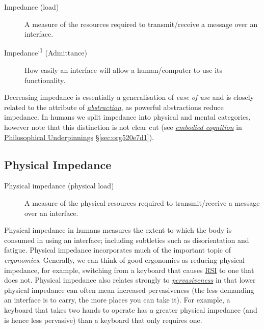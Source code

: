 \documentclass[logo,bsc,singlespacing,parskip]{infthesis}
\begin{document}
\begin{mdframed}
\begin{description}
\item[{Impedance\label{impedance} (load)}] A measure of the resources required to transmit/receive a message over an interface.

\item[{Impedance\textsuperscript{-1} (Admittance)}] How easily an interface will allow a human/computer to use its functionality.
\end{description}
\end{mdframed}

Decreasing impedance is essentially a generalisation of \emph{ease of use} and is closely related to the attribute of \emph{\hyperref[abstraction]{abstraction}}, as powerful abstractions reduce impedance.
In humans we split impedance into physical and mental categories, however note that this distinction is not clear cut (see \emph{\hyperref[orgb456c86]{embodied cognition}} in \hyperref[sec:org520e7d1]{Philosophical Underpinnings} \S \ref{sec:org520e7d1}).
\subsection{Physical Impedance}
\label{sec:org3532ca3}
\medskip
\begin{mdframed}
\begin{description}
\item[{Physical impedance\label{physical impedance} (physical load)}] A measure of the physical resources required to transmit/receive a message over an interface.
\end{description}
\end{mdframed}

Physical impedance in humans measures the extent to which the body is consumed in using an interface; including subtleties such as disorientation and fatigue.
Physical impedance incorporates much of the important topic of \emph{ergonomics}.
Generally, we can think of good ergonomics as reducing physical impedance, for example, switching from a keyboard that causes \hyperref[org503fc2d]{RSI} to one that does not.
Physical impedance also relates strongly to \emph{\hyperref[pervasiveness]{pervasiveness}} in that lower physical impedance can often mean increased pervasiveness (the less demanding an interface is to carry, the more places you can take it).
For example, a keyboard that takes two hands to operate has a greater physical impedance (and is hence less pervasive) than a keyboard that only requires one.
\end{document}
